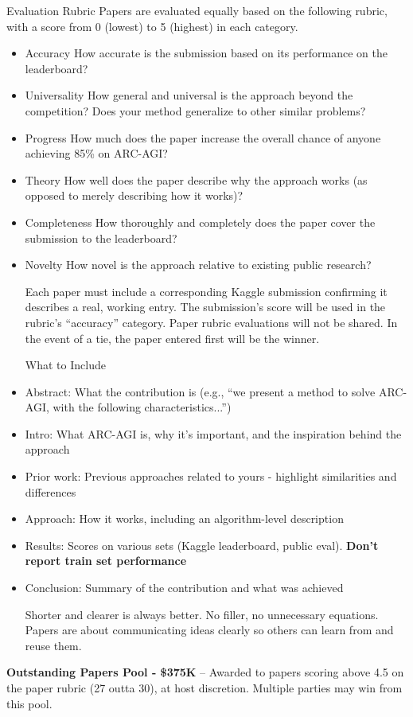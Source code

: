 \documentclass{article}
\begin{document}
Evaluation Rubric  Papers are evaluated equally based on the following rubric, with a score from 0 (lowest) to 5 (highest) in each category.

\begin{itemize}
    \item Accuracy	How accurate is the submission based on its performance on the leaderboard?
    \item Universality	How general and universal is the approach beyond the competition? Does your method generalize to other similar problems?
    \item Progress	How much does the paper increase the overall chance of anyone achieving 85\% on ARC-AGI?
    \item Theory	How well does the paper describe why the approach works (as opposed to merely describing how it works)?
    \item Completeness	How thoroughly and completely does the paper cover the submission to the leaderboard?
    \item Novelty	How novel is the approach relative to existing public research? 

Each paper must include a corresponding Kaggle submission confirming it describes a real, working entry. The submission's score will be used in the rubric's “accuracy” category.  Paper rubric evaluations will not be shared. In the event of a tie, the paper entered first will be the winner.

What to Include 
\item  Abstract: What the contribution is (e.g., “we present a method to solve ARC-AGI, with the following characteristics...”)     
\item Intro: What ARC-AGI is, why it's important, and the inspiration behind the approach     
\item Prior work: Previous approaches related to yours - highlight similarities and differences     
\item Approach: How it works, including an algorithm-level description     
\item Results: Scores on various sets (Kaggle leaderboard, public eval). \textbf{Don't report train set performance}    
\item Conclusion: Summary of the contribution and what was achieved 

Shorter and clearer is always better. No filler, no unnecessary equations. Papers are about communicating ideas clearly so others can learn from and reuse them.
\end{itemize}

\textbf{Outstanding Papers Pool - \$375K} -- Awarded to papers scoring above 4.5 on the paper rubric (27 outta 30), at host discretion. Multiple parties may win from this pool.



\end{document}
